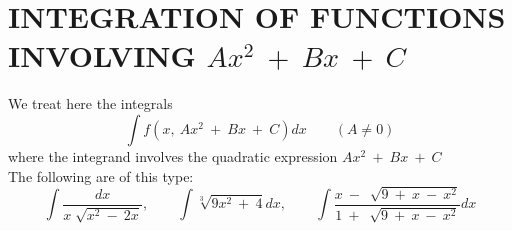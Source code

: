 \documentclass{article}
\begin{document}
\section{INTEGRATION OF FUNCTIONS INVOLVING 
        $
        A x^2
        \ +\ 
        B x
        \ +\ 
        C
        $}
We treat here the integrals
$$
\int 
    f(x,\ Ax^2\ +\ Bx\ +\ C)
dx 
\qquad 
(
    A
    \neq
    0
)
$$ 
where the integrand involves the quadratic expression 
$
A x^2
\ +\ 
B x
\ +\ 
C
$\\
The following are of this type:
$$
\int 
    \frac
        {dx}
        {
            x
            \sqrt
                []
                {
                    x^2
                    \ -\ 
                    2x
                }
        }
        ,
\qquad 
\int 
    \sqrt
        [3]
        {
            9 x^2
            \ +\ 
            4
        } 
dx
,
\qquad 
\int 
    \frac
        {
            x
            \ -\ 
            \sqrt
                []
                {
                    9
                    \ +\ 
                    x
                    \ -\ 
                    x^2
                }
        }
        {
            1
            \ +\ 
            \sqrt
                []
                {
                    9
                    \ +\ 
                    x
                    \ -\ 
                    x^2
                }
        } 
dx
$$
\end{document}
